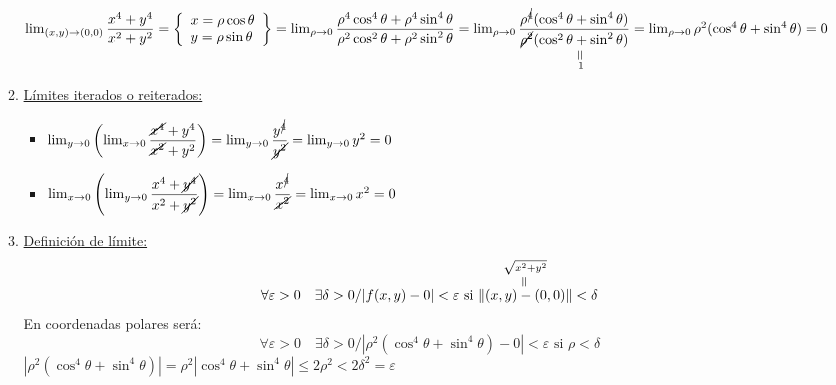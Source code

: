 \begin{enumerate}[label=\color{red}\textbf{\arabic*)}, leftmargin=*]
\begin{enumerate}[label=\arabic*)]
			$\lim_{(x,y)\to(0,0)}\dfrac{x^4+y^4}{x^2+y^2}=\left\{\begin{array}{l}
			x=\rho\cos\theta\\
			y=\rho\sin\theta
			\end{array}\right\}=\lim_{\rho\to0}\dfrac{\rho^4\cos^4\theta+\rho^4\sin^4\theta}{\rho^2\cos^2\theta+\rho^2\sin^2\theta}=\lim_{\rho\to0}\dfrac{\rho^{\cancel{4}}(\cos^4\theta+\sin^4\theta)}{\cancel{\rho^2}\underset{\begin{subarray}{c}
			\rotatebox{90}{=}\\
			1
			\end{subarray}}{(\cos^2\theta+\sin^2\theta)}}=\linebreak\lim_{\rho\to0}\rho^2(\cos^4\theta+\sin^4\theta)=0$
			\item \underline{Límites iterados o reiterados:}
			\begin{itemize}
			\item $\lim_{y\to0}\left(\lim_{x\to0}\dfrac{\cancel{x^4}+y^4}{\cancel{x^2}+y^2}\right)=\lim_{y\to0}\dfrac{y^{\cancel{4}}}{\cancel{y^2}}=\lim_{y\to0}y^2=0$
			\item $\lim_{x\to0}\left(\lim_{y\to0}\dfrac{x^4+\cancel{y^4}}{x^2+\cancel{y^2}}\right)=\lim_{x\to0}\dfrac{x^{\cancel{4}}}{\cancel{x^2}}=\lim_{x\to0}x^2=0$
			\end{itemize}
			\item \underline{Definición de límite:} 
			\[ \forall\varepsilon>0\quad\exists\delta>0/|f(x,y)-0|<\varepsilon\text{ si }\overset{\begin{subarray}{c}
			\sqrt{x^2+y^2}\\
			\rotatebox{90}{=}
			\end{subarray}}{\|(x,y)-(0,0)\|}<\delta \]En coordenadas polares será:
			\[ \forall\varepsilon>0\quad\exists\delta>0/|\rho^2(\cos^4\theta+\sin^4\theta)-0|<\varepsilon\text{ si }\rho<\delta \] $|\rho^2(\cos^4\theta+\sin^4\theta)|=\rho^2|\cos^4\theta+\sin^4\theta|\le2\rho^2<\boxed{2\delta^2=\varepsilon}$
			

\end{enumerate}
\end{enumerate}
